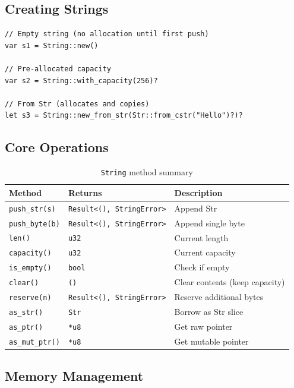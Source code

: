 \subsection{Creating Strings}

\begin{lstlisting}
// Empty string (no allocation until first push)
var s1 = String::new()

// Pre-allocated capacity
var s2 = String::with_capacity(256)?

// From Str (allocates and copies)
let s3 = String::new_from_str(Str::from_cstr("Hello")?)?
\end{lstlisting}

\subsection{Core Operations}

\begin{table}[h]
\centering
\begin{tabular}{lll}
\textbf{Method} & \textbf{Returns} & \textbf{Description} \\
\hline
\texttt{push\_str(s)} & \texttt{Result<(), StringError>} & Append Str \\
\texttt{push\_byte(b)} & \texttt{Result<(), StringError>} & Append single byte \\
\texttt{len()} & \texttt{u32} & Current length \\
\texttt{capacity()} & \texttt{u32} & Current capacity \\
\texttt{is\_empty()} & \texttt{bool} & Check if empty \\
\texttt{clear()} & \texttt{()} & Clear contents (keep capacity) \\
\texttt{reserve(n)} & \texttt{Result<(), StringError>} & Reserve additional bytes \\
\texttt{as\_str()} & \texttt{Str} & Borrow as Str slice \\
\texttt{as\_ptr()} & \texttt{*u8} & Get raw pointer \\
\texttt{as\_mut\_ptr()} & \texttt{*u8} & Get mutable pointer \\
\end{tabular}
\caption{\texttt{String} method summary}
\end{table}

\subsection{Memory Management}

